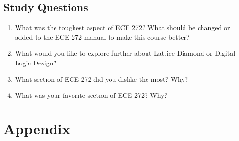 \documentclass[12pt]{article}
\numberwithin{figure}{section}
\begin{document}
\subsection*{Study Questions}

\begin{enumerate}
  \item What was the toughest aspect of ECE 272? What should be changed or added to the ECE 272 manual to make this course better?



  \item What would you like to explore further about Lattice Diamond or Digital Logic Design?



  \item What section of ECE 272 did you dislike the most? Why?



  \item What was your favorite section of ECE 272? Why?


\end{enumerate}

\section*{Appendix} \label{sec:appendix}






\end{document}

